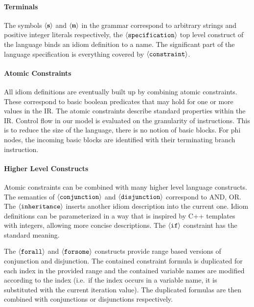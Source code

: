     \paragraph{Terminals}
    The symbols $\left<\text{\bf s}\right>$ and $\left<\text{\bf n}\right>$ in
    the grammar correspond to arbitrary strings and positive integer literals
    respectively,
    the $\left<\text{\tt specification}\right>$ top level construct of the
    language binds an idiom definition to a name.
    The significant  part of the language specification is everything covered by
    $\left<\text{\tt constraint}\right>$.

    \paragraph{Atomic Constraints}
    All idiom definitions are eventually built up by combining atomic
    constraints.
    These correspond to basic boolean predicates that may hold for one or more
    values in the IR.
    The atomic constraints describe standard properties within the IR.
    Control flow in our model is evaluated on the granularity of instructions.
    This is to reduce the size of the language, there is no notion of basic
    blocks.
    For phi nodes, the incoming basic blocks are identified with their
    terminating branch instruction.

    \paragraph{Higher Level Constructs}
    Atomic constraints can be combined with many higher level language
    constructs.
    The semantics of $\left<\text{\tt conjunction}\right>$ and $\left<\text{\tt disjunction}\right>$ correspond to AND, OR.
    The $\left<\text{\tt inheritance}\right>$ inserts another idiom description
    into the current one.
    Idiom definitions can be parameterized in a way that is inspired by C++
    templates with integers, allowing more concise descriptions.
    The $\left<\text{\tt if}\right>$ constraint has the standard meaning.

    The $\left<\text{\tt forall}\right>$ and $\left<\text{\tt forsome}\right>$
    constructs provide range based versions of conjunction and disjunction.
    The contained constraint formula is duplicated for each index in the
    provided range and the contained variable names are modified according to
    the index (i.e.\ if the index occurs in a variable name, it is substituted
    with the current iteration value).
    The duplicated formulas are then combined with conjunctions or disjunctions
    respectively.

